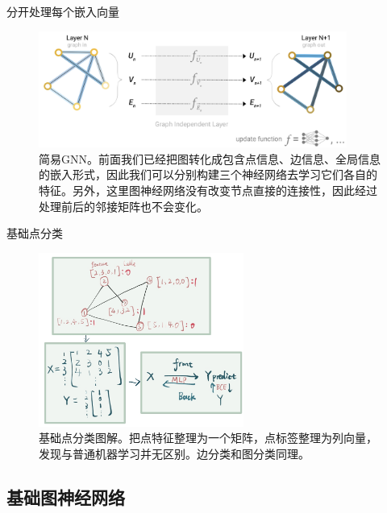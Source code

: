 \documentclass{beamer}
\begin{document}
\begin{frame}{分开处理每个嵌入向量}
\begin{figure}
    \centering
    \includegraphics[width=0.9\textwidth]{简易GNN.png}
    \caption{简易GNN。前面我们已经把图转化成包含点信息、边信息、全局信息的嵌入形式，因此我们可以分别构建三个神经网络去学习它们各自的特征。另外，这里图神经网络没有改变节点直接的连接性，因此经过处理前后的邻接矩阵也不会变化。}
\end{figure}
\end{frame}

\begin{frame}{基础点分类}
    \begin{figure}
    \centering
    \includegraphics[width=0.6\textwidth]{点分类例子.png}
    \caption{基础点分类图解。把点特征整理为一个矩阵，点标签整理为列向量，发现与普通机器学习并无区别。边分类和图分类同理。}
\end{figure}
\end{frame}

\subsection{基础图神经网络}
\end{document}

